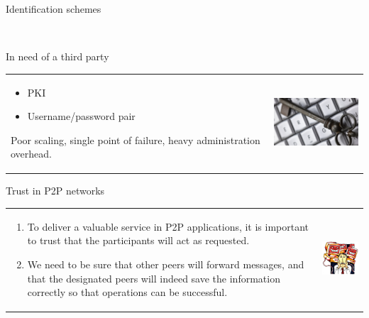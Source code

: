 \documentclass[12pt]{beamer}
\renewcommand{\frametitle}[1]{\vspace{0.2cm}\begin{huge}#1\end{huge}}
\renewcommand{\framesubtitle}[1]{\\ \vspace{0.4cm} \hspace{0.4cm}\begin{large}#1\end{large}}
\begin{document}
  \begin{frame}
  \frametitle{Identification schemes}
  \framesubtitle{In need of a third party}
  \begin{table}
  \begin{tabular}{p{7cm}p{3cm}}
  \begin{itemize}
      \item PKI
      \item Username/password pair
  \end{itemize}
  
  Poor scaling, single point of failure, heavy administration overhead.
  &
  \vspace{1.5cm}
  \includegraphics[width=4cm]{../../presentacion/img/keyboard_key}\\
  \end{tabular}
  \end{table}
  \end{frame}
  
  \begin{frame}
  \frametitle{Trust in P2P networks}
  \begin{table}
  \begin{tabular}{p{7cm}p{3cm}}
  \begin{enumerate}
      \item To deliver a valuable service in P2P applications, it
  is important to trust that the participants will act as requested.
      \item We need to be sure that other peers will forward
  messages, and that the designated peers will indeed save the information
  correctly so that operations can be successful.
  \end{enumerate}
  &
  \vspace{1.5cm}
  \includegraphics[width=4cm]{../../presentacion/img/malicious}\\
  \end{tabular}
  \end{table}
  \end{frame}
  
\end{document}
